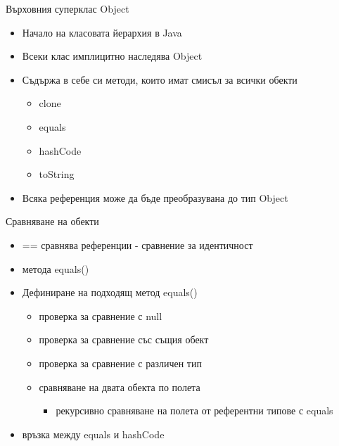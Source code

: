 \documentclass{beamer}
\begin{document}
\begin{frame}{Върховния суперклас Object}
  \transdissolve
  \begin{itemize}
  \item Начало на класовата йерархия в Java
  \item Всеки клас имплицитно наследява Object
  \item Съдържа в себе си методи, които имат смисъл за всички обекти
    \begin{itemize}
      \item clone
      \item equals
      \item hashCode
      \item toString
    \end{itemize}
  \item Всяка референция може да бъде преобразувана до тип Object
  \end{itemize}
\end{frame}

\begin{frame}{Сравняване на обекти}
  \transdissolve
  \begin{itemize}
  \item == сравнява референции - сравнение за идентичност
  \item метода equals()
  \item Дефиниране на подходящ метод equals()
    \begin{itemize}
      \item проверка за сравнение с null
      \item проверка за сравнение със същия обект
      \item проверка за сравнение с различен тип
      \item сравняване на двата обекта по полета
      \begin{itemize}
        \item рекурсивно сравняване на полета от референтни типове с equals
      \end{itemize}

    \end{itemize}

  \item връзка между equals и hashCode
  \end{itemize}
\end{frame}
\end{document}
